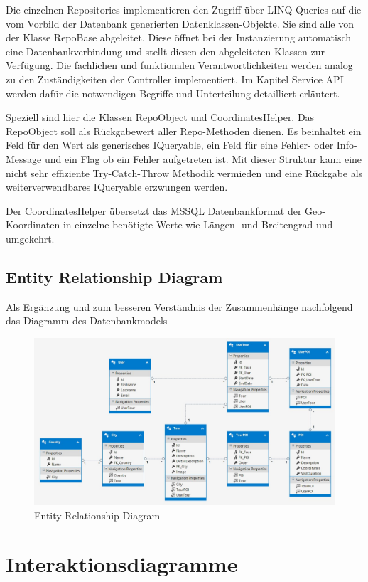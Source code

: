 \documentclass[a4paper,10pt,xetex]{article}
\begin{document}
Die einzelnen Repositories implementieren den Zugriff \"uber LINQ-Queries auf die vom Vorbild der Datenbank generierten
Datenklassen\--Objekte. Sie sind alle von der Klasse RepoBase abgeleitet. Diese \"offnet bei der Instanzierung
automatisch eine Datenbankverbindung und stellt diesen den abgeleiteten Klassen zur Verf\"ugung. Die fachlichen und
funktionalen Verantwortlichkeiten werden analog zu den Zust\"andigkeiten der Controller implementiert. Im Kapitel
Service API werden daf\"ur die notwendigen Begriffe und Unterteilung detailliert erl\"autert.

Speziell sind hier die Klassen RepoObject und CoordinatesHelper. Das RepoObject soll als R\"uckgabewert aller
Repo-Methoden dienen. Es beinhaltet ein Feld f\"ur den Wert als generisches IQueryable, ein Feld f\"ur eine Fehler-
oder Info-Message und ein Flag ob ein Fehler aufgetreten ist. Mit dieser Struktur kann eine nicht sehr effiziente
Try-Catch-Throw Methodik vermieden und eine R\"uckgabe als weiterverwendbares IQueryable erzwungen werden.

Der CoordinatesHelper \"ubersetzt das MSSQL Datenbankformat der Geo-Koordinaten in einzelne ben\"otigte Werte wie
L\"angen- und Breitengrad und umgekehrt.

\subsection{Entity Relationship Diagram}\label{erm}
Als Erg\"anzung und zum besseren Verst\"andnis der Zusammenh\"ange nachfolgend das Diagramm des Datenbankmodels

\begin{figure}
  \centering
  \includegraphics{erm}
  \caption{Entity Relationship Diagram}
\end{figure}

\section{Interaktionsdiagramme}\label{interaktionsdiagramme}
\end{document}
